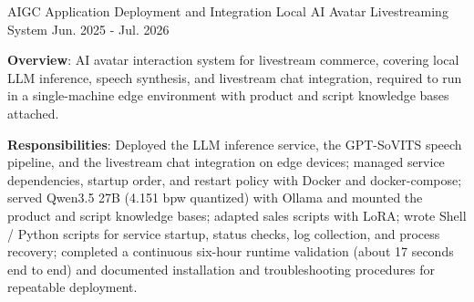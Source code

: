 
\begin{cventries}

  \cventry
    {AIGC Application Deployment and Integration}
    {Local AI Avatar Livestreaming System}
    {}
    {Jun. 2025 - Jul. 2026}
    {
      \begin{cvitems}
        \item {\textbf{Overview}: AI avatar interaction system for livestream commerce, covering local LLM inference, speech synthesis, and livestream chat integration, required to run in a single-machine edge environment with product and script knowledge bases attached.}
        \item {\textbf{Responsibilities}: Deployed the LLM inference service, the GPT-SoVITS speech pipeline, and the livestream chat integration on edge devices; managed service dependencies, startup order, and restart policy with Docker and docker-compose; served Qwen3.5 27B (4.151 bpw quantized) with Ollama and mounted the product and script knowledge bases; adapted sales scripts with LoRA; wrote Shell / Python scripts for service startup, status checks, log collection, and process recovery; completed a continuous six-hour runtime validation (about 17 seconds end to end) and documented installation and troubleshooting procedures for repeatable deployment.}
      \end{cvitems}
    }

\end{cventries}
